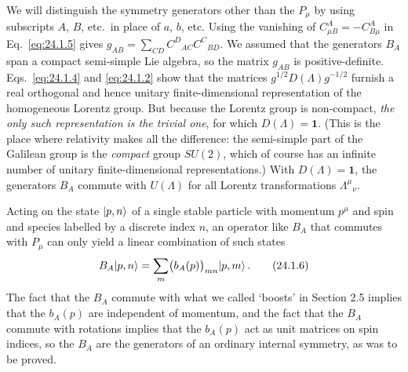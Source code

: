 We will distinguish the symmetry generators other than the $P_\mu$ by using
subscripts $A$, $B$, etc.\ in place of $a$, $b$, etc. Using the
vanishing of $C^A_{\mu B}=-C^A_{B\mu}$ in Eq.~\eqref{eq:24.1.5} gives
$g_{AB}=\sum_{CD}C^D{}_{AC}C^C{}_{BD}$. We assumed that the generators $B_A$
span a compact semi-simple Lie algebra, so the matrix $g_{AB}$ is
positive-definite. Eqs.~\eqref{eq:24.1.4} and \eqref{eq:24.1.2} show that the
matrices $g^{1/2}D(\Lambda)g^{-1/2}$ furnish a real orthogonal and hence unitary
finite-dimensional representation of the homogeneous Lorentz group. But
because the Lorentz group is non-compact, \emph{the only such representation is
the trivial one}, for which $D(\Lambda)=\mathbf{1}$. (This is the place where
relativity makes all the difference: the semi-simple part of the Galilean group
is the \emph{compact} group $SU(2)$, which of course has an infinite number of
unitary finite-dimensional representations.) With
$D(\Lambda)=\mathbf{1}$, the generators $B_A$ commute with $U(\Lambda)$ for all
Lorentz transformations $\Lambda^\mu{}_\nu$.

Acting on the state $\lvert p,n\rangle$ of a single stable particle with momentum
$p^\mu$ and spin and species labelled by a discrete index $n$, an operator like
$B_A$ that commutes with $P_\mu$ can only yield a linear combination of such
states
\begin{equation}
  B_A\lvert p,n\rangle
  =\sum_m\bigl(b_A(p)\bigr)_{mn}\lvert p,m\rangle\,.
  \tag{24.1.6}\label{eq:24.1.6}
\end{equation}
The fact that the $B_A$ commute with what we called `boosts' in Section 2.5
implies that the $b_A(p)$ are independent of momentum, and the fact that the
$B_A$ commute with rotations implies that the $b_A(p)$ act as unit matrices on
spin indices, so the $B_A$ are the generators of an ordinary internal
symmetry, as was to be proved.

